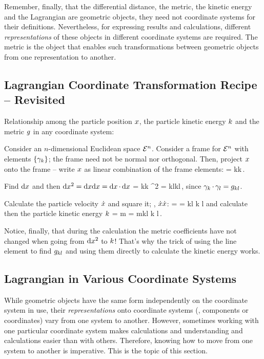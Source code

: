 Remember, finally, that the differential distance, the metric, the kinetic energy and the Lagrangian are geometric objects, they need not coordinate systems for their definitions. Nevertheless, for expressing results and calculations, different \emph{representations} of these objects in different coordinate systems are required. The metric is the object that enables such transformations between geometric objects from one representation to another.


\subsection{Lagrangian Coordinate Transformation Recipe -- Revisited}
Relationship among the particle position $x$, the particle kinetic energy $k$ and the metric $g$ in any coordinate system:

Consider an $n$-dimensional Euclidean space $\mathcal{E}^{n}$. Consider a frame for $\mathcal{E}^{n}$ with elements $\left\lbrace{\gamma_{k}}\right\rbrace$; the frame need not be normal nor orthogonal. Then, project $x$ onto the frame -- write $x$ as linear combination of the frame elements:
\beq
\pvec = \ifvec k\comp\pvec k\,.
\eeq

Find $\text{d}x$ and then $\text{d}x^2 = \text{d}x\text{d}x = \text{d}x\operatorname{\cdot}\text{d}x$
\beq
  \dx\pvec = \ifvec k\dx\comp\pvec k\implies
\dx\pvec^2 = \imet kl\comp\pvec k\comp\pvec l\,,
\eeq
since $\gamma_{k}\operatorname{\cdot}\gamma_{l} = g_{{k}{l}}$.

Calculate the particle velocity $\dot{x}$ and square it; \ie, $\dot{x}\dot{x}$:
\beq
\dt\pvec = \implies
\dt\pvec\dt\pvec = \imet kl\cntens{\dt\pvec} k\cntens{\dt\pvec} l
\eeq
and calculate then the particle kinetic energy $k$
\beq
\ken = m\dt\pvec\dt\pvec
     = m\imet kl\cntens{\dt\pvec} k\cntens{\dt\pvec} l\,.
\eeq

Notice, finally, that during the calculation the metric coefficients have not changed when going from $\text{d}x^2$ to $k$! That's why the trick of using the line element to find $g_{{k}{l}}$ and using them directly to calculate the kinetic energy works.



\subsection{Lagrangian in Various Coordinate Systems}
While geometric objects have the same form independently on the coordinate system in use, their \emph{representations} onto coordinate systems (\ie, components or coordinates) vary from one system to another. However, sometimes working with one particular coordinate system makes calculations and understanding and calculations easier than with others. Therefore, knowing how to move from one system to another is imperative. This is the topic of this section.


